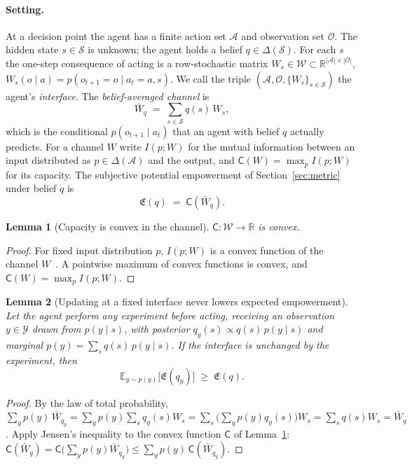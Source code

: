 \documentclass[letterpaper]{article} %
\newtheorem{lemma}{Lemma}
\theoremstyle{definition}
\providecommand{\E}{\mathbb{E}}
\providecommand{\R}{\mathbb{R}}
\providecommand{\cA}{\mathcal{A}}
\providecommand{\cO}{\mathcal{O}}
\providecommand{\cS}{\mathcal{S}}
\providecommand{\cW}{\mathcal{W}}
\providecommand{\Emp}{\mathfrak{E}}
\providecommand{\Capa}{\mathsf{C}}
\begin{document}
\paragraph{Setting.}
At a decision point the agent has a finite action set $\cA$ and observation set $\cO$. The hidden state $s \in \cS$ is unknown; the agent holds a belief $q \in \Delta(\cS)$. For each $s$ the one-step consequence of acting is a row-stochastic matrix $W_s \in \cW \subset \R^{|\cA| \times |\cO|}$, $W_s(o \mid a) = p(o_{t+1} = o \mid a_t = a, s)$. We call the triple $(\cA, \cO, \{W_s\}_{s \in \cS})$ the agent's \emph{interface}. The \emph{belief-averaged channel} is
\begin{equation}
  \bar W_q \;=\; \sum_{s \in \cS} q(s)\, W_s ,
  \label{eq:mixed}
\end{equation}
which is the conditional $p(o_{t+1} \mid a_t)$ that an agent with belief $q$ actually predicts. For a channel $W$ write $I(p; W)$ for the mutual information between an input distributed as $p \in \Delta(\cA)$ and the output, and $\Capa(W) = \max_{p} I(p; W)$ for its capacity. The subjective potential empowerment of Section~\ref{sec:metric} under belief $q$ is
\begin{equation}
  \Emp(q) \;=\; \Capa(\bar W_q).
  \label{eq:emp}
\end{equation}

\begin{lemma}[Capacity is convex in the channel]
\label{lem:convex}
$\Capa : \cW \to \R$ is convex.
\end{lemma}
\begin{proof}
For fixed input distribution $p$, $I(p; W)$ is a convex function of the channel $W$~\citep[Theorem~2.7.4]{coverElementsInformationTheory2006}. A pointwise maximum of convex functions is convex, and $\Capa(W) = \max_p I(p; W)$.
\end{proof}

\begin{lemma}[Updating at a fixed interface never lowers expected empowerment]
\label{lem:update}
Let the agent perform any experiment before acting, receiving an observation $y \in \mathcal{Y}$ drawn from $p(y \mid s)$, with posterior $q_y(s) \propto q(s)\, p(y \mid s)$ and marginal $p(y) = \sum_s q(s)\, p(y \mid s)$. If the interface is unchanged by the experiment, then
\begin{equation}
  \E_{y \sim p(y)}\big[\Emp(q_y)\big] \;\ge\; \Emp(q).
  \label{eq:update}
\end{equation}
\end{lemma}
\begin{proof}
By the law of total probability, $\sum_y p(y)\, \bar W_{q_y} = \sum_y p(y) \sum_s q_y(s) W_s = \sum_s \big(\sum_y p(y) q_y(s)\big) W_s = \sum_s q(s) W_s = \bar W_q$. Apply Jensen's inequality to the convex function $\Capa$ of Lemma~\ref{lem:convex}: $\Capa(\bar W_q) = \Capa\big(\sum_y p(y) \bar W_{q_y}\big) \le \sum_y p(y)\, \Capa(\bar W_{q_y})$.
\end{proof}
\end{document}
